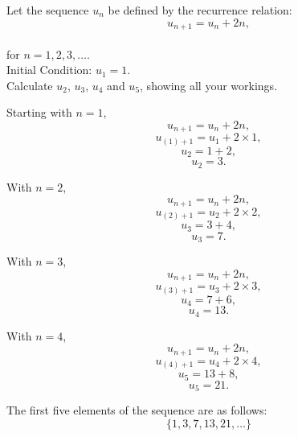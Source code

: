 

Let the sequence $u_n$ be defined by the recurrence relation:
\[ u_{n+1} = u_n + 2n, \]
\\ \bigskip
for $n=1,2,3,\ldots$. \\ \bigskip Initial Condition: $u_1=1$.\\ \bigskip Calculate $u_2$, $u_3$, $u_4$ and $u_5$, showing all your workings.

Starting with $n=1$,
\[ u_{n+1} = u_n + 2n, \]
\[ u_{(1)+1} = u_{1} + 2\times 1, \]
\[ u_{2} = 1 + 2, \]
\[ u_{2} = 3. \]

With $n=2$,
\[ u_{n+1} = u_n + 2n, \]
\[ u_{(2)+1} = u_{2} + 2\times 2, \]
\[ u_{3} = 3 + 4, \]
\[ u_{3} = 7. \]

With $n=3$,
\[ u_{n+1} = u_n + 2n, \]
\[ u_{(3)+1} = u_{3} + 2\times 3, \]
\[ u_{4} = 7 + 6, \]
\[ u_{4} = 13. \]

With $n=4$,
\[ u_{n+1} = u_n + 2n, \]
\[ u_{(4)+1} = u_{4} + 2\times 4, \]
\[ u_{5} = 13 + 8, \]
\[ u_{5} = 21. \]

The first five elements of the sequence are as follows:
\[ \{1,3,7,13,21, \ldots\}
\]

